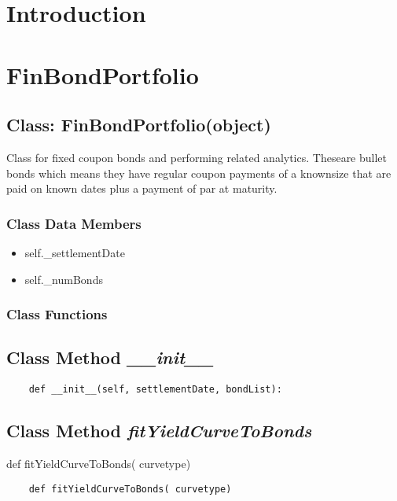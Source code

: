 \documentclass[twoside,11pt]{book}
\begin{document}
\section{Introduction}

\newpage
\section{FinBondPortfolio}

\subsection{Class: FinBondPortfolio(object)}
Class for fixed coupon bonds and performing related analytics. Theseare bullet bonds which means they have regular coupon payments of a knownsize that are paid on known dates plus a payment of par at maturity.

\subsubsection{Class Data Members}
\begin{itemize}
\item{self.\_settlementDate}
\item{self.\_numBonds}
\end{itemize}

\subsubsection{Class Functions}

\subsection{Class Method {\it \_\_init\_\_}}


\begin{lstlisting}
    def __init__(self, settlementDate, bondList):
\end{lstlisting}

\subsection{Class Method {\it fitYieldCurveToBonds}}
def fitYieldCurveToBonds( curvetype) 

\begin{lstlisting}
    def fitYieldCurveToBonds( curvetype) 


\end{lstlisting}
\end{document}
